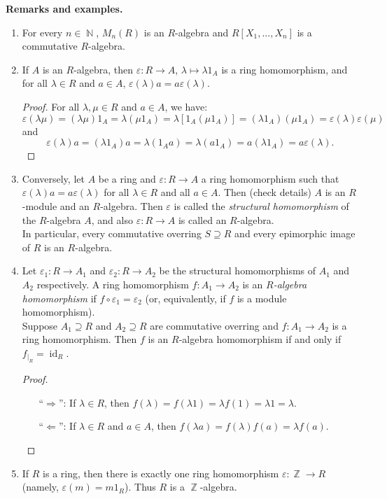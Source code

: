 \documentclass[12pt,a4paper]{report}
\theoremstyle{definition}
\theoremstyle{num.custom-title}
\DeclareMathOperator{\id}{id}
\DeclareMathOperator{\N}{\mathbb{N}}
\DeclareMathOperator{\Z}{\mathbb{Z}}
\DeclareMathOperator{\imp}{\Rightarrow}
\DeclareMathOperator{\pmi}{\Leftarrow}
\renewcommand{\epsilon}{\varepsilon}
\begin{document}
\noindent\textbf{Remarks and examples.}
\begin{enumerate}
\item For every $n \in \N$, $M_n(R)$ is an $R$-algebra and $R[X_1,...,X_n]$ is a commutative $R$-algebra.
\item If $A$ is an $R$-algebra, then $\epsilon : R \to A$, $\lambda \mapsto \lambda 1_A$ is a ring homomorphism, and for all $\lambda \in R$ and $a \in A$, $\epsilon(\lambda) a = a \epsilon(\lambda)$.
\begin{proof}
For all $\lambda, \mu \in R$ and $a \in A$, we have:
\[
\epsilon(\lambda\mu) = (\lambda\mu) 1_A = \lambda(\mu 1_A) = \lambda [1_A (\mu 1_A)] = (\lambda 1_A)(\mu 1_A) = \epsilon(\lambda) \epsilon(\mu)
\]
and
\[
\epsilon(\lambda) a = (\lambda 1_A) a = \lambda (1_A a) = \lambda (a 1_A) = a (\lambda 1_A) = a \epsilon(\lambda).
\]
\end{proof}
\item Conversely, let $A$ be a ring and $\epsilon : R \to A$ a ring homomorphism such that $\epsilon(\lambda)a = a \epsilon(\lambda)$ for all $\lambda \in R$ and all $a \in A$. Then (check details) $A$ is an $R$-module and an $R$-algebra. Then $\epsilon$ is called the \emph{structural homomorphism} of the $R$-algebra $A$, and also $\epsilon : R \to A$ is called an $R$-algebra.\\
In particular, every commutative overring $S \supseteq R$ and every epimorphic image of $R$ is an $R$-algebra.
\item Let $\epsilon_1 : R \to A_1$ and $\epsilon_2 : R \to A_2$ be the structural homomorphisms of $A_1$ and $A_2$ respectively. A ring homomorphism $f: A_1 \to A_2$ is an $R$\emph{-algebra homomorphism} if $f \circ \epsilon_1 = \epsilon_2$ (or, equivalently, if $f$ is a module homomorphism).\\
Suppose $A_1 \supseteq R$ and $A_2 \supseteq R$ are commutative overring and $f : A_1 \to A_2$ is a ring homomorphism. Then $f$ is an $R$-algebra homomorphism if and only if $f_{|_R}=\id_R$.
\begin{proof}\ 
\begin{itemize}
\item[``$\imp$'':] If $\lambda \in R$, then $f(\lambda) = f(\lambda 1) = \lambda f(1) = \lambda 1 = \lambda$.
\item[``$\pmi$'':] If $\lambda \in R$ and $a \in A$, then $f(\lambda a) = f(\lambda) f(a) = \lambda f(a)$. \qedhere
\end{itemize}
\end{proof}
\item If $R$ is a ring, then there is exactly one ring homomorphism $\epsilon : \Z \to R$ (namely, $\epsilon(m)=m 1_R$). Thus $R$ is a $\Z$-algebra.
\end{enumerate}
\end{document}
